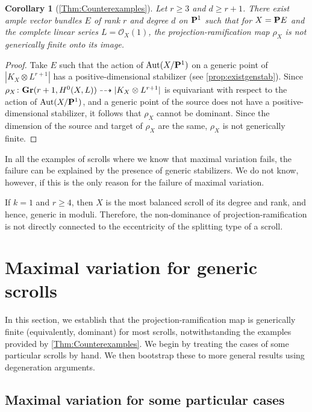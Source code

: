 \documentclass[11pt,reqno]{amsart}
\theoremstyle{plain}
\newtheorem{corollary}[theorem]{Corollary}
\theoremstyle{definition}
\theoremstyle{remark}
\numberwithin{equation}{section}
\numberwithin{equation}{section}
\renewcommand{\O}{\mathcal O}
\begin{document}
\begin{corollary}[\autoref{Thm:Counterexamples}]
  Let $r \geq 3$ and $d \geq r+1$.
  There exist ample vector bundles $E$ of rank $r$ and degree $d$ on $\P^1$ such that for $X = \P E$ and the complete linear series $L = \O_X(1)$, the projection-ramification map $\rho_X$ is not generically finite onto its image.
\end{corollary}
\begin{proof}
  Take $E$ such that the action of $\Aut(X/\P^1)$ on a generic point of $|K_X\otimes L^{r+1}|$ has a positive-dimensional stabilizer (see \autoref{prop:existgenstab}).
  Since $\rho_X \from \Gr(r+1, H^0(X, L)) \dashrightarrow |K_X \otimes L^{r+1}|$ is equivariant with respect to the action of $\Aut(X/\P^1)$, and a generic
  point of the source does not have a positive-dimensional stabilizer, it follows that $\rho_X$ cannot be dominant.
  Since the dimension of the source and target of $\rho_X$ are the same, $\rho_X$ is not generically finite.
\end{proof}

\begin{remark}
In all the examples of scrolls where we know that maximal variation fails, the failure can be explained by the presence of generic stabilizers.
We do not know, however, if this is the only reason for the failure of maximal variation.
\end{remark}

\begin{remark}
  If $k = 1$ and $r \geq 4$, then $X$ is the most balanced scroll of its degree and rank, and hence, generic in moduli.
  Therefore, the non-dominance of projection-ramification is not directly connected to the eccentricity of the splitting type of a scroll. 
\end{remark}

\section{Maximal variation for generic scrolls}
In this section, we establish that the projection-ramification map is generically finite (equivalently, dominant) for most scrolls, notwithstanding the examples provided by \autoref{Thm:Counterexamples}.
We begin by treating the cases of some particular scrolls by hand.
We then bootstrap these to more general results using degeneration arguments.

\subsection{Maximal variation for some particular cases}
\end{document}
